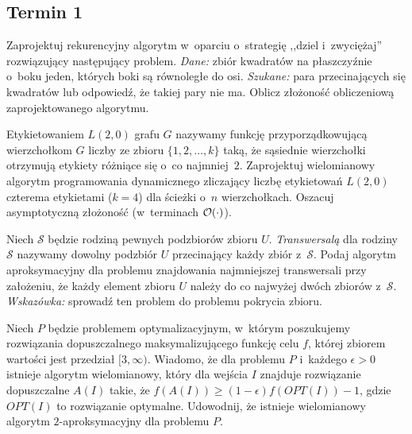 \subsection{Termin 1}

\begin{zadanie}
	Zaprojektuj rekurencyjny algorytm w~oparciu o~strategię ,,dziel i~zwyciężaj''
	rozwiązujący następujący problem. \emph{Dane:} zbiór kwadratów na płaszczyźnie
	o~boku jeden, których boki są równoległe do osi. \emph{Szukane:} para
	przecinających się kwadratów lub odpowiedź, że takiej pary nie ma. Oblicz
	złożoność obliczeniową zaprojektowanego algorytmu.
\end{zadanie}

\begin{zadanie}
	Etykietowaniem $L(2,0)$ grafu $G$ nazywamy funkcję przyporządkowującą
	wierzchołkom $G$ liczby ze zbioru $\{1,2,\dots,k\}$ taką, że sąsiednie
	wierzchołki otrzymują etykiety różniące się o~co najmniej~$2$. Zaprojektuj
	wielomianowy algorytm programowania dynamicznego zliczający liczbę
	etykietowań $L(2,0)$ czterema etykietami ($k=4$) dla ścieżki o~$n$
	wierzchołkach. Oszacuj asymptotyczną złożoność (w~terminach $\mathcal{O}(\cdot)$).
\end{zadanie}

\begin{zadanie}
	Niech $\mathcal{S}$ będzie rodziną pewnych podzbiorów zbioru $U$.
	\emph{Transwersalą} dla rodziny $\mathcal{S}$ nazywamy dowolny podzbiór $U$
	przecinający każdy zbiór z~$\mathcal{S}$. Podaj algorytm aproksymacyjny dla
	problemu znajdowania najmniejszej transwersali przy założeniu, że każdy
	element zbioru $U$ należy do co najwyżej dwóch zbiorów z~$\mathcal{S}$.
	\emph{Wskazówka:} sprowadź ten problem do problemu pokrycia zbioru.
\end{zadanie}

\begin{zadanie}
	Niech $P$ będzie problemem optymalizacyjnym, w~którym poszukujemy rozwiązania
	dopuszczalnego maksymalizującego funkcję celu $f$, której zbiorem wartości
	jest przedział $[3,\infty)$. Wiadomo, że dla problemu $P$ i~każdego
	$\epsilon>0$ istnieje algorytm wielomianowy, który dla wejścia $I$ znajduje
	rozwiązanie dopuszczalne $A(I)$ takie, że $f(A(I))\geq(1-\epsilon)f(OPT(I))-1$,
	gdzie $OPT(I)$ to rozwiązanie optymalne. Udowodnij, że istnieje wielomianowy
	algorytm $2$-aproksymacyjny dla problemu $P$.
\end{zadanie}

